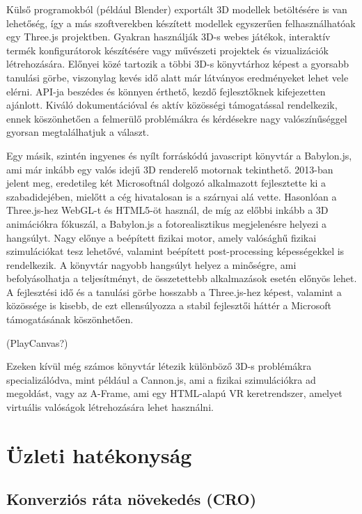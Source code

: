 \documentclass[12pt]{report}
\begin{document}
        Külső programokból (például Blender) exportált 3D modellek betöltésére is van lehetőség, így a más szoftverekben készített modellek egyszerűen felhasználhatóak egy Three.js projektben. Gyakran használják 3D-s webes játékok, interaktív termék konfigurátorok készítésére vagy művészeti projektek és vizualizációk létrehozására. Előnyei közé tartozik a többi 3D-s könyvtárhoz képest a gyorsabb tanulási görbe, viszonylag kevés idő alatt már látványos eredményeket lehet vele elérni. API-ja beszédes és könnyen érthető, kezdő fejlesztőknek kifejezetten ajánlott. Kiváló dokumentációval és aktív közösségi támogatással rendelkezik, ennek köszönhetően a felmerülő problémákra és kérdésekre nagy valószínűséggel gyorsan megtalálhatjuk a választ. 
        
        Egy másik, szintén ingyenes és nyílt forráskódú javascript könyvtár a Babylon.js, ami már inkább egy valós idejű 3D renderelő motornak tekinthető. 2013-ban jelent meg, eredetileg két Microsoftnál dolgozó alkalmazott fejlesztette ki a szabadidejében, mielőtt a cég hivatalosan is a szárnyai alá vette. Hasonlóan a Three.js-hez WebGL-t és HTML5-öt használ, de míg az előbbi inkább a 3D animációkra fókuszál, a Babylon.js a fotorealisztikus megjelenésre helyezi a hangsúlyt. Nagy előnye a beépített fizikai motor, amely valósághű fizikai szimulációkat tesz lehetővé, valamint beépített post-processing képességekkel is rendelkezik. A könyvtár nagyobb hangsúlyt helyez a minőségre, ami befolyásolhatja a teljesítményt, de összetettebb alkalmazások esetén előnyös lehet. A fejlesztési idő és a tanulási görbe hosszabb a Three.js-hez képest, valamint a közössége is kisebb, de ezt ellensúlyozza a stabil fejlesztői háttér a Microsoft támogatásának köszönhetően.

        (PlayCanvas?)

        Ezeken kívül még számos könyvtár létezik különböző 3D-s problémákra specializálódva, mint például a Cannon.js, ami a fizikai szimulációkra ad megoldást, vagy az A-Frame, ami egy HTML-alapú VR keretrendszer, amelyet virtuális valóságok létrehozására lehet használni.
        
        \section{Üzleti hatékonyság}
        \subsection{Konverziós ráta növekedés (CRO)}
\end{document}
